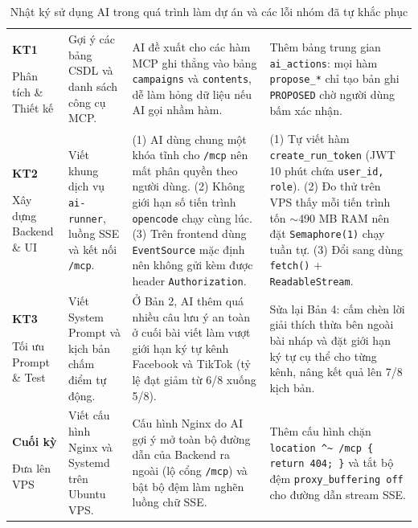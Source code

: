 \begin{table}[!htbp]
\centering
\scriptsize
\renewcommand{\arraystretch}{1.02}
\caption{Nhật ký sử dụng AI trong quá trình làm dự án và các lỗi nhóm đã tự khắc phục}
\label{tab:sdlc-ai-log}
\begin{tabularx}{\textwidth}{|C{1.8cm}|L{2.8cm}|Y|Y|}
\hline
{} &  &  & \\
\hline
\textbf{KT1}\par Phân tích \& Thiết kế & Gợi ý các bảng CSDL và danh sách công cụ MCP. & AI đề xuất cho các hàm MCP ghi thẳng vào bảng \texttt{campaigns} và \texttt{contents}, dễ làm hỏng dữ liệu nếu AI gọi nhầm hàm. & Thêm bảng trung gian \texttt{ai\_actions}: mọi hàm \texttt{propose\_*} chỉ tạo bản ghi \texttt{PROPOSED} chờ người dùng bấm xác nhận.\\
\hline
\textbf{KT2}\par Xây dựng Backend \& UI & Viết khung dịch vụ \texttt{ai-runner}, luồng SSE và kết nối \texttt{/mcp}. & (1) AI dùng chung một khóa tĩnh cho \texttt{/mcp} nên mất phân quyền theo người dùng. (2) Không giới hạn số tiến trình \texttt{opencode} chạy cùng lúc. (3) Trên frontend dùng \texttt{EventSource} mặc định nên không gửi kèm được header \texttt{Authorization}. & (1) Tự viết hàm \texttt{create\_run\_token} (JWT 10 phút chứa \texttt{user\_id, role}). (2) Đo thử trên VPS thấy mỗi tiến trình tốn $\sim$490 MB RAM nên đặt \texttt{Semaphore(1)} chạy tuần tự. (3) Đổi sang dùng \texttt{fetch()} + \texttt{ReadableStream}.\\
\hline
\textbf{KT3}\par Tối ưu Prompt \& Test & Viết System Prompt và kịch bản chấm điểm tự động. & Ở Bản 2, AI thêm quá nhiều câu lưu ý an toàn ở cuối bài viết làm vượt giới hạn ký tự kênh Facebook và TikTok (tỷ lệ đạt giảm từ 6/8 xuống 5/8). & Sửa lại Bản 4: cấm chèn lời giải thích thừa bên ngoài bài nháp và đặt giới hạn ký tự cụ thể cho từng kênh, nâng kết quả lên 7/8 kịch bản.\\
\hline
\textbf{Cuối kỳ}\par Đưa lên VPS & Viết cấu hình Nginx và Systemd trên Ubuntu VPS. & Cấu hình Nginx do AI gợi ý mở toàn bộ đường dẫn của Backend ra ngoài (lộ cổng \texttt{/mcp}) và bật bộ đệm làm nghẽn luồng chữ SSE. & Thêm cấu hình chặn \texttt{location \^{}\~{} /mcp \{ return 404; \}} và tắt bộ đệm \texttt{proxy\_buffering off} cho đường dẫn stream SSE.\\
\hline
\end{tabularx}
\end{table}

